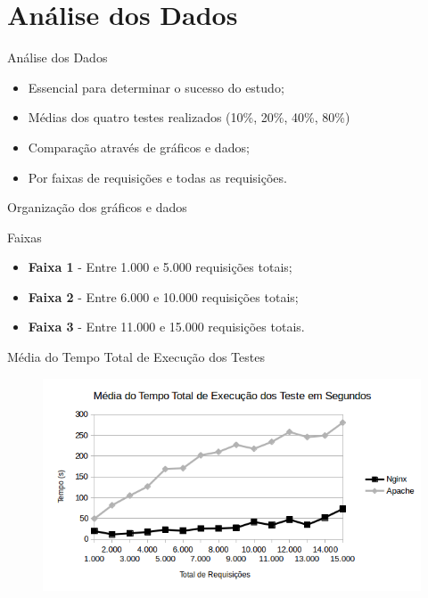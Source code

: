 \section{Análise dos Dados}\label{sec:analise-dos-dados}

\begin{frame}{Análise dos Dados}
	\begin{block}{}
		\begin{itemize}
			\item Essencial para determinar o sucesso do estudo;
			\item Médias dos quatro testes realizados (10\%, 20\%, 40\%, 80\%)
			\item Comparação através de gráficos e dados;
			\item Por faixas de requisições e todas as requisições.
		\end{itemize}
	\end{block}
\end{frame}

\begin{frame}{Organização dos gráficos e dados}
	\begin{block}{Faixas}
		\begin{itemize}
			\item \textbf{Faixa 1} - Entre 1.000 e 5.000 requisições totais;
			\item \textbf{Faixa 2} - Entre 6.000 e 10.000 requisições totais;
			\item \textbf{Faixa 3} - Entre 11.000 e 15.000 requisições totais.
		\end{itemize}
	\end{block}
\end{frame}

\begin{frame}{Média do Tempo Total de Execução dos Testes}
	\begin{figure}
		\centering
		\includegraphics[width=1\linewidth]{../graficos/grafico1} 
	\end{figure}
\end{frame}

